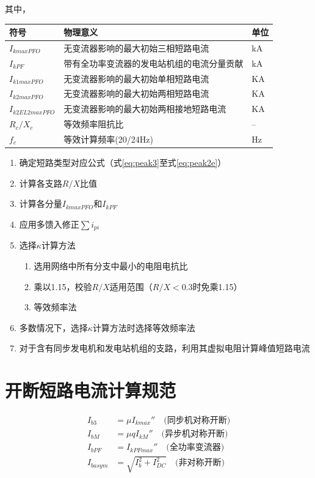 \documentclass[a4paper,11pt,AutoFakeBold]{ctexart}
\begin{document}
其中，

\begin{tabular}{lll}
符号 & 物理意义 & 单位 \\
\hline
$I_{kmaxPFO}$ & 无变流器影响的最大初始三相短路电流 & \si{kA} \\
$I_{kPF}$ & 带有全功率变流器的发电站机组的电流分量贡献 & \si{kA} \\
$I_{k1maxPFO}$ & 无变流器影响的最大初始单相短路电流 & \si{KA} \\
$I_{k2maxPFO}$ & 无变流器影响的最大初始两相短路电流 & \si{KA} \\
$I_{k2EL2maxPFO}$ & 无变流器影响的最大初始两相接地短路电流 & \si{KA} \\
$R_c/X_c$ & 等效频率阻抗比 & -- \\
$f_c$ & 等效计算频率(20/24Hz) & \si{Hz} \\
\end{tabular}


\begin{enumerate}
\item 确定短路类型对应公式（式\ref{eq:peak3}至式\ref{eq:peak2e}）
\item 计算各支路$R/X$比值
\item 计算各分量$I_{kmaxPFO}$和$I_{kPF}$
\item 应用多馈入修正$\sum i_{pi}$
\item 选择$\kappa$计算方法
\begin{enumerate}[label=\alph*)]
    \item 选用网络中所有分支中最小的电阻电抗比
    \item 乘以1.15，校验$R/X$适用范围（$R/X<0.3$时免乘1.15）
    \item 等效频率法
\end{enumerate}
\item 多数情况下，选择$\kappa$计算方法时选择等效频率法
\item 对于含有同步发电机和发电站机组的支路，利用其虚拟电阻计算峰值短路电流
\end{enumerate}

\newpage
\section{开断短路电流计算规范}

\begin{align}
I_{b3} &= \mu I_{kmax} ''\quad \text{(同步机对称开断)} \label{eq:ib3} \\
I_{bM} &= \mu q I_{kM} ''\quad \text{(异步机对称开断)} \label{eq:ibm} \\
I_{bPF} &= I_{kPFmax} ''\quad \text{(全功率变流器)} \label{eq:ibpf} \\
I_{basym} &= \sqrt{I_b^2 + I_{DC}^2} \quad \text{(非对称开断)} \label{eq:ibasym}
\end{align}
\end{document}
